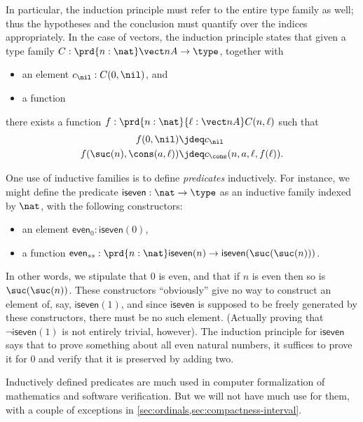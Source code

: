 In particular, the induction principle must refer to the entire type family as well; thus the hypotheses and the conclusion must quantify over the indices appropriately.
In the case of vectors, the induction principle states that given a type family $C:\prd{n:\nat} \vect n A \to \type$, together with
\begin{itemize}
\item an element $c_\nil : C(0,\nil)$, and
\item a function 
\end{itemize}
there exists a function $f:\prd{n:\nat}{\ell:\vect n A} C(n,\ell)$ such that
\begin{align*}
  f(0,\nil) &\jdeq c_\nil\\
  f(\suc(n),\cons(a,\ell)) &\jdeq c_\cons(n,a,\ell,f(\ell)).
\end{align*}

%
%
One use of inductive families is to define \emph{predicates} inductively.
For instance, we might define the predicate $\mathsf{iseven}:\nat\to\type$ as an inductive family indexed by $\nat$, with the following constructors:
\begin{itemize}
\item an element $\mathsf{even}_0 : \mathsf{iseven}(0)$,
\item a function $\mathsf{even}_{ss} : \prd{n:\nat} \mathsf{iseven}(n) \to \mathsf{iseven}(\suc(\suc(n)))$.
\end{itemize}
In other words, we stipulate that $0$ is even, and that if $n$ is even then so is $\suc(\suc(n))$.
These constructors ``obviously'' give no way to construct an element of, say, $\mathsf{iseven}(1)$, and since $\mathsf{iseven}$ is supposed to be freely generated by these constructors, there must be no such element.
(Actually proving that $\neg \mathsf{iseven}(1)$ is not entirely trivial, however).
The induction principle for $\mathsf{iseven}$ says that to prove something about all even natural numbers, it suffices to prove it for $0$ and verify that it is preserved by adding two.

%
Inductively defined predicates are much used in computer formalization of mathematics and software verification.
But we will not have much use for them, with a couple of exceptions in \cref{sec:ordinals,sec:compactness-interval}.

